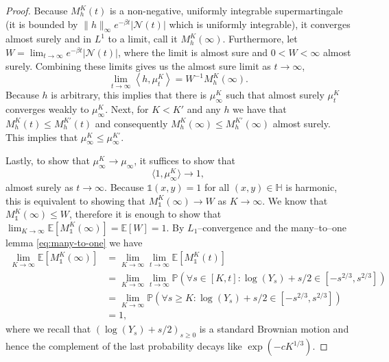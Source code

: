 \documentclass{article}
\theoremstyle{definition}
\numberwithin{equation}{section}
\numberwithin{thm}{section}
\newcommand*{\EE}{\ensuremath{\mathbb{E}}}	        	%
\newcommand*{\PP}{\ensuremath{\mathbb{P}}}	        	%
\newcommand*{\HH}{\ensuremath{\mathbb{H}}}	        	%
\newcommand*{\II}{\ensuremath{\mathds{1}}}	        	%
\begin{document}
\begin{proof}
     Because $M^K_h(t)$ is a non-negative, uniformly integrable supermartingale (it is bounded by $\|{h}\|_{\infty} e^{-\beta t}\vert\mathcal{N}(t)\vert$ which is uniformly integrable), it converges almost surely and in $L^1$ to a limit, call it $M^K_h(\infty)$. 
     Furthermore, let $W= \lim_{t\to\infty}e^{-\beta t}\vert \mathcal{N}(t)\vert$, where the limit is almost sure and $0<W<\infty$ almost surely. Combining {these limits} gives us the almost sure limit as $t\to\infty$,
     \begin{equation*}
         \lim_{t\to\infty}\left\langle h, \mu_t^K\right\rangle  = W^{-1}M_h^K(\infty). 
     \end{equation*}
     Because $h$ is arbitrary, this implies that there is $\mu^K_\infty$ such that {almost surely} $\mu^K_t$ converges weakly to $\mu^K_\infty$. Next, for $K < K'$ and any $h$ we have that $M^K_h(t) \leq M^{K'}_h(t)$ and consequently $M^K_h(\infty) \leq M_h^{K'}(\infty)$ almost surely. This implies that $\mu_\infty^K \leq \mu_\infty^{K'}$.

     Lastly, to show that $\mu_\infty^K \to \mu_\infty$, it suffices to show that 
     \begin{equation*}
         \langle1,\mu_\infty^K\rangle \to 1,
     \end{equation*}
     almost surely as $t \to \infty$. Because $\II(x,y)=1$ for all $(x,y)\in \HH$ is harmonic, this is equivalent to showing that $M^K_\II(\infty) \to W$ as $K \to \infty$. We know that $M^K_\II(\infty) \leq W$, therefore it is enough to show that $\lim_{K \to \infty} \EE[M^K_\II(\infty)] = \EE[W]=1$. By $L_1$--convergence and the many--to--one lemma \eqref{eq:many-to-one} we have
     \begin{align*}
         \lim_{K \to \infty} \EE\left[M^K_\II(\infty)\right] & = \lim_{K \to \infty} \lim_{t \to \infty} \EE\left[M^K_\II(t)\right] \\&
         = \lim_{K \to \infty} \lim_{t \to \infty} \PP\left(\forall s \in [K,t]: \log (Y_s)+s/2 \in [-s^{2/3},s^{2/3}]\right) \\
         &= \lim_{K \to \infty}  \PP\left(\forall s \geq K: \log (Y_s)+s/2 \in [-s^{2/3},s^{2/3}]\right) \\
         &=1,
     \end{align*}
     where we recall that $(\log (Y_s)+s/2 )_{s\geq 0}$ is a standard Brownian motion and hence the {complement of the} last probability decays like $\exp(-cK^{1/3})$.     
\end{proof}
\end{document}

